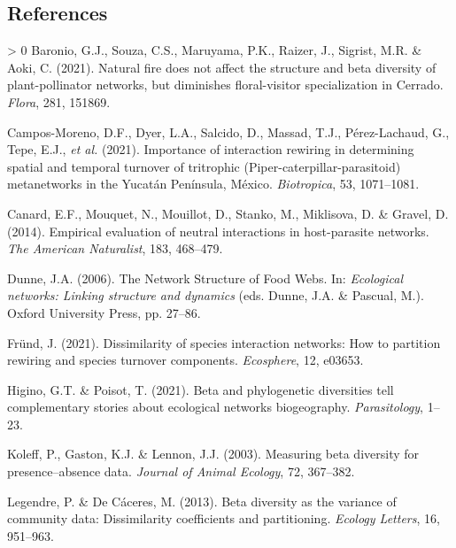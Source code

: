 \documentclass[10pt,oneside]{article}
\newlength{\cslhangindent}
\newenvironment{CSLReferences}[3] %
 {%
  \setlength{\parindent}{0pt}
  \ifodd #1 \everypar{\setlength{\hangindent}{\cslhangindent}}\ignorespaces\fi
  \ifnum #2 > 0
  \setlength{\parskip}{#2\baselineskip}
  \fi
 }%
 {}
\begin{document}
\hypertarget{references}{%
\subsection*{References}\label{references}}

\hypertarget{refs}{}
\begin{CSLReferences}{1}{0}
\leavevmode\hypertarget{ref-Baronio2021NatFir}{}%
Baronio, G.J., Souza, C.S., Maruyama, P.K., Raizer, J., Sigrist, M.R. \&
Aoki, C. (2021). Natural fire does not affect the structure and beta
diversity of plant-pollinator networks, but diminishes floral-visitor
specialization in Cerrado. \emph{Flora}, 281, 151869.

\leavevmode\hypertarget{ref-Campos-Moreno2021ImpInt}{}%
Campos-Moreno, D.F., Dyer, L.A., Salcido, D., Massad, T.J.,
Pérez-Lachaud, G., Tepe, E.J., \emph{et al.} (2021). Importance of
interaction rewiring in determining spatial and temporal turnover of
tritrophic (Piper-caterpillar-parasitoid) metanetworks in the Yucatán
Península, México. \emph{Biotropica}, 53, 1071--1081.

\leavevmode\hypertarget{ref-Canard2014EmpEva}{}%
Canard, E.F., Mouquet, N., Mouillot, D., Stanko, M., Miklisova, D. \&
Gravel, D. (2014). Empirical evaluation of neutral interactions in
host-parasite networks. \emph{The American Naturalist}, 183, 468--479.

\leavevmode\hypertarget{ref-Dunne2006NetStr}{}%
Dunne, J.A. (2006). The Network Structure of Food Webs. In:
\emph{Ecological networks: Linking structure and dynamics} (eds. Dunne,
J.A. \& Pascual, M.). Oxford University Press, pp. 27--86.

\leavevmode\hypertarget{ref-Frund2021DisSpe}{}%
Fründ, J. (2021). Dissimilarity of species interaction networks: How to
partition rewiring and species turnover components. \emph{Ecosphere},
12, e03653.

\leavevmode\hypertarget{ref-Higino2021BetPhy}{}%
Higino, G.T. \& Poisot, T. (2021). Beta and phylogenetic diversities
tell complementary stories about ecological networks biogeography.
\emph{Parasitology}, 1--23.

\leavevmode\hypertarget{ref-Koleff2003MeaBet}{}%
Koleff, P., Gaston, K.J. \& Lennon, J.J. (2003). Measuring beta
diversity for presence--absence data. \emph{Journal of Animal Ecology},
72, 367--382.

\leavevmode\hypertarget{ref-Legendre2013BetDiv}{}%
Legendre, P. \& De Cáceres, M. (2013). Beta diversity as the variance of
community data: Dissimilarity coefficients and partitioning.
\emph{Ecology Letters}, 16, 951--963.


\end{CSLReferences}
\end{document}
